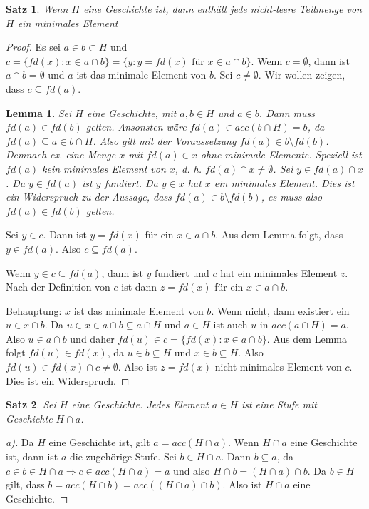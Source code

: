 \documentclass[german]{article}
\theoremstyle{break}
\theoremstyle{def_style}
\theoremstyle{def_style}
\newtheorem{satz}{Satz}[section]
\theoremstyle{lemma_style}
\newtheorem*{lemma}{Lemma}
\begin{document}
\begin{satz}
	Wenn $H$ eine Geschichte ist, dann enthält jede nicht-leere Teilmenge von $H$ ein minimales Element
\end{satz}
\begin{proof}
	Es sei $a\in b \subset H$ und $c=\{fd(x) : x \in a\cap b\}=\{y:y=fd(x)\text{ für } x\in a \cap b\}$.
	Wenn $c=\emptyset$, dann ist $a\cap b = \emptyset$ und $a$ ist das minimale Element von $b$.
	Sei $c\neq \emptyset$. Wir wollen zeigen, dass $c\subseteq fd(a)$.
	
	\begin{lemma}
		Sei $H$ eine Geschichte, mit $a,b\in H$ und $a\in b$. Dann muss $fd(a)\in fd(b)$ gelten. Ansonsten wäre $fd(a)\in acc(b\cap H)=b$, da $fd(a)\subseteq a \in b \cap H$. Also gilt mit der Voraussetzung $fd(a)\in b \setminus fd(b)$. Demnach ex. eine Menge $x$ mit $fd(a)\in x$ ohne minimale Elemente. Speziell ist $fd(a)$ kein minimales Element von $x$, d. h. $fd(a)\cap x \neq \emptyset$. Sei $y\in fd(a)\cap x$. Da $y\in fd(a)$ ist $y$ fundiert. Da $y \in x$ hat $x$ ein minimales Element. Dies ist ein Widerspruch zu der Aussage, dass $fd(a)\in b \setminus fd(b)$, es muss also $fd(a)\in fd(b)$ gelten.
	\end{lemma}

	Sei $y\in c$. Dann ist $y = fd(x)$ für ein $x\in a\cap b$. Aus dem Lemma folgt, dass $y\in fd(a)$. Also $c\subseteq fd(a)$.
	
	Wenn $y\in c \subseteq fd(a)$, dann ist $y$ fundiert und $c$ hat ein minimales Element $z$. Nach der Definition von $c$ ist dann $z=fd(x)$ für ein $x\in a\cap b$.
	
	Behauptung: $x$ ist das minimale Element von $b$. Wenn nicht, dann existiert ein $u \in x \cap b$. Da $u \in x \in a\cap b\subseteq a\cap H$ und $a\in H$ ist auch $u$ in $acc(a\cap H)=a$. Also $u \in a\cap b$ und daher $fd(u)\in c = \{fd(x):x\in a\cap b\}$. Aus dem Lemma folgt $fd(u)\in fd(x)$, da $u\in b \subseteq H$ und $x\in b \subseteq H$. Also $fd(u)\in fd(x)\cap c \neq \emptyset$. Also ist $z=fd(x)$ nicht minimales Element von $c$. Dies ist ein Widerspruch.
\end{proof}

\begin{satz}
	Sei $H$ eine Geschichte. Jedes Element $a\in H$ ist eine Stufe mit Geschichte $H\cap a$.
	\label{ElementVonGeschichteIstStufe}
\end{satz}
\begin{proof}[a)]
	Da $H$ eine Geschichte ist, gilt $a=acc(H\cap a)$. Wenn $H\cap a$ eine Geschichte ist, dann ist $a$ die zugehörige Stufe. Sei $b\in H \cap a$. Dann $b\subseteq a$, da $c\in b \in H\cap a \Rightarrow c \in acc(H\cap a)=a$ und also $H\cap b = (H\cap a)\cap b$. Da $b\in H$ gilt, dass $b=acc(H\cap b) = acc((H\cap a)\cap b)$. Also ist $H\cap a$ eine Geschichte.
\end{proof}
\end{document}
